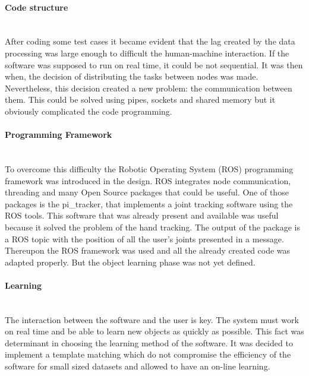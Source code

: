 \paragraph{Code structure}
\mbox{} \\

After coding some test cases it became evident that the lag created by the data processing was large enough to difficult the human-machine interaction. 
If the software was supposed to run on real time, it could be not sequential. 
It was then when, the decision of distributing the tasks between nodes was made. 
Nevertheless, this decision created a new problem: the communication between them. 
This could be solved using pipes, sockets and shared memory but it obviously complicated the code programming. 
\\


\paragraph{Programming Framework}
\mbox{} \\

To overcome this difficulty the Robotic Operating System (ROS) programming framework was introduced in the design.
ROS integrates node communication, threading and many Open Source packages that could be useful. 
One of those packages is the pi\_tracker, that implements a joint tracking software using the ROS tools. 
This software that was already present and available was useful because it solved the problem of the hand tracking. 
The output of the package is a ROS topic with the position of all the user's joints presented in a message. 
Thereupon the ROS framework was used and all the already created code was adapted properly. 
But the object learning phase was not yet defined. 
\\


\paragraph{Learning}
\mbox{} \\

The interaction between the software and the user is key. 
The system must work on real time and be able to learn new objects as quickly as possible. 
This fact was determinant in choosing the learning method of the software. 
It was decided to implement a template matching which do not compromise the efficiency of the software for small sized datasets and allowed to have an on-line learning. 
\\

